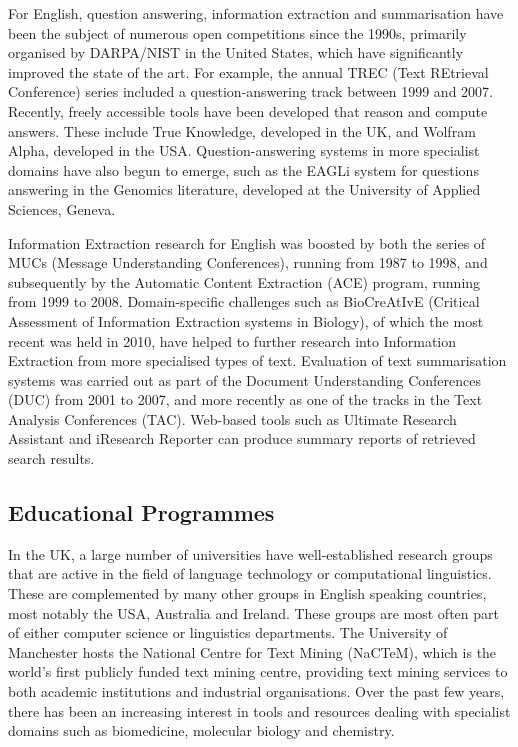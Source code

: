 \begin{multicols}{2}
For English, question answering, information extraction and summarisation have been the subject of numerous open competitions since the 1990s, primarily organised by DARPA/NIST in the United States, which have significantly improved the state of the art. For example, the annual TREC (Text REtrieval Conference) series included a question-answering track between 1999 and 2007. Recently, freely accessible tools have been developed that reason and compute answers. These include True Knowledge, developed in the UK, and Wolfram Alpha, developed in the USA. Question-answering systems in more specialist domains have also begun to emerge, such as the EAGLi system for questions answering in the Genomics literature, developed at the University of Applied Sciences, Geneva.

Information Extraction research for English was boosted by both the series of MUCs (Message Understanding Conferences), running from 1987 to 1998, and subsequently by the Automatic Content Extraction (ACE) program, running from 1999 to 2008. Domain-specific challenges such as BioCreAtIvE (Critical Assessment of Information Extraction systems in Biology), of which the most recent was held in 2010, have helped to further research into Information Extraction from more specialised types of text. Evaluation of text summarisation systems was carried out as part of the Document Understanding Conferences (DUC) from 2001 to 2007, and more recently as one of the tracks in the Text Analysis Conferences (TAC). Web-based tools such as Ultimate Research Assistant and iResearch Reporter can produce summary reports of retrieved search results.

\subsection{Educational Programmes}

In the UK, a large number of universities have well-established research groups that are active in the field of language technology or computational linguistics. These are complemented by many other groups in English speaking countries, most notably the USA, Australia and Ireland. These groups are most often part of either computer science or linguistics departments. The University of Manchester hosts the National Centre for Text Mining (NaCTeM), which is the world's first publicly funded text mining centre, providing text mining services to both academic institutions and industrial organisations. Over the past few years, there has been an increasing interest in tools and resources dealing with specialist domains such as biomedicine, molecular biology and chemistry. 


\end{multicols}
